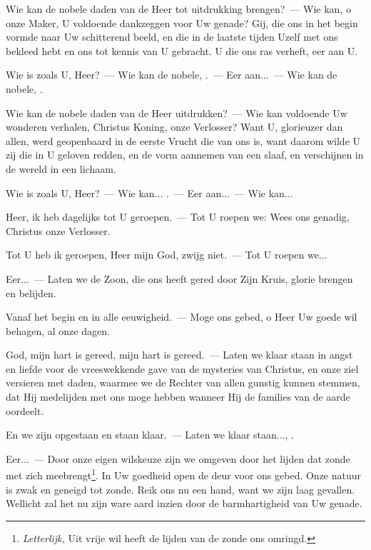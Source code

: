 \documentclass[12pt,twoside,a5paper]{article}
\begin{document}

\begin{halfparskip}
  Wie kan de nobele daden van de Heer tot uitdrukking brengen?~--- Wie kan, o onze Maker, U voldoende dankzeggen voor Uw genade? Gij, die ons in het begin vormde naar Uw schitterend beeld, en die in de laatste tijden Uzelf met ons bekleed hebt en ons tot kennis van U gebracht. U die ons ras verheft, eer aan U.

  Wie is zoals U, Heer?~--- Wie kan de nobele, .~--- Eer aan...~--- Wie kan de nobele, .
\end{halfparskip}


\begin{halfparskip}
  Wie kan de nobele daden van de Heer uitdrukken?~--- Wie kan voldoende Uw wonderen verhalen, Christus Koning, onze Verlosser? Want U, glorieuzer dan allen, werd geopenbaard in de eerste Vrucht die van ons is, want daarom wilde U zij die in U geloven redden, en de vorm aannemen van een slaaf, en verschijnen in de wereld in een lichaam.

  Wie is zoals U, Heer?~--- Wie kan... .~--- Eer aan...~--- Wie kan...
\end{halfparskip}


\begin{halfparskip}
  Heer, ik heb dagelijks tot U geroepen.~--- Tot U roepen we: Wees ons genadig, Christus onze Verlosser.

  Tot U heb ik geroepen, Heer mijn God, zwijg niet.~--- Tot U roepen we...

  Eer...~--- Laten we de Zoon, die ons heeft gered door Zijn Kruis, glorie brengen en belijden.

  Vanaf het begin en in alle eeuwigheid.~--- Moge ons gebed, o Heer Uw goede wil behagen, al onze dagen.
\end{halfparskip}


\begin{halfparskip}
  God, mijn hart is gereed, mijn hart is gereed.~--- Laten we klaar staan in angst en liefde voor de vreeswekkende gave van de mysteries van Christus, en onze ziel versieren met daden, waarmee we de Rechter van allen gunstig kunnen stemmen, dat Hij medelijden met ons moge hebben wanneer Hij de families
  van de aarde oordeelt.

  En we zijn opgestaan en staan klaar.~--- Laten we klaar staan..., .

  Eer...~--- Door onze eigen wilskeuze zijn we omgeven door het lijden dat zonde met zich meebrengt\footnote{\emph{Letterlijk,} Uit vrije wil heeft de lijden van de zonde ons omringd.}. In Uw goedheid open de deur voor ons gebed. Onze natuur is zwak en geneigd tot zonde. Reik ons nu een hand, want we zijn laag gevallen. Wellicht zal het nu zijn ware aard inzien door de barmhartigheid van Uw genade.
\end{halfparskip}
\end{document}
